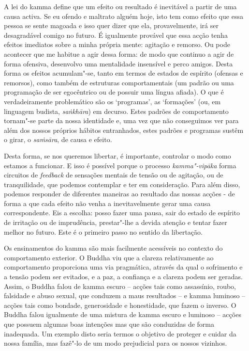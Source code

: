 A lei do kamma define que um efeito ou resultado é inevitável a partir de uma
causa activa. Se eu ofendo e maltrato alguém hoje, isto tem como efeito que essa
pessoa se sente magoada e isso quer dizer que ela, provavelmente, irá ser
desagradável comigo no futuro. É igualmente provável que essa acção tenha
efeitos imediatos sobre a minha própria mente: agitação e remorso. Ou pode
acontecer que me habitue a agir dessa forma: de modo que continuo a agir de
forma ofensiva, desenvolvo uma mentalidade insensível e perco amigos. Desta
forma os efeitos acumulam"-se, tanto em termos de estados de espírito (ofensas e
remorsos), como também de estruturas comportamentais (um padrão ou uma
programação de ser egocêntrico ou de possuir uma língua afiada). O que é
verdadeiramente problemático são os `programas', as `formações' (ou, em
linguagem budista, \emph{saṅkhāra}) em decurso. Estes padrões de comportamento
tornam"-se parte da nossa identidade e, uma vez que não conseguimos ver para além
dos nossos próprios hábitos entranhados, estes padrões e programas sustêm o
girar, o \emph{saṁsāra}, de causa e efeito.

Desta forma, se nos queremos libertar, é importante, controlar o modo como
estamos a funcionar. E isso é possível porque o processo \emph{kamma"-vipāka}
forma circuitos de \emph{feedback} de sensações mentais de tensão ou de
agitação, ou de tranquilidade, que podemos contemplar e ter em consideração.
Para além disso, podemos responder de diferentes maneiras ao resultado das
nossas acções - de forma a que cada efeito não venha a inevitavelmente gerar uma
causa correspondente. Eis a escolha: posso fazer uma pausa, sair do estado de
espírito de irritação ou de imprudência, prestar"-lhe a devida atenção e tentar
fazer melhor no futuro. Este é o primeiro passo no sentido da libertação.

Os ensinamentos do kamma são mais facilmente acessíveis no contexto do
comportamento exterior. O Buddha viu que a clareza relativamente ao
comportamento proporciona uma via pragmática, através da qual o sofrimento e a
tensão podem ser evitados, e a paz, a confiança e a clareza podem ser geradas.
Assim, o Buddha falou de kamma escuro -- acções tais como assassínio, roubo,
falsidade e abuso sexual, que conduzem a maus resultados -- e kamma luminoso --
acções tais como bondade, generosidade e honestidade, que fazem o inverso. O
Buddha falou igualmente de uma mistura de kamma escuro e luminoso -- acções que
possuem algumas boas intenções mas que são conduzidas de forma inadequada. Um
exemplo disto seria termos o objetivo de proteger e cuidar da nossa família, mas
fazê"-lo de um modo prejudicial para os nossos vizinhos.

